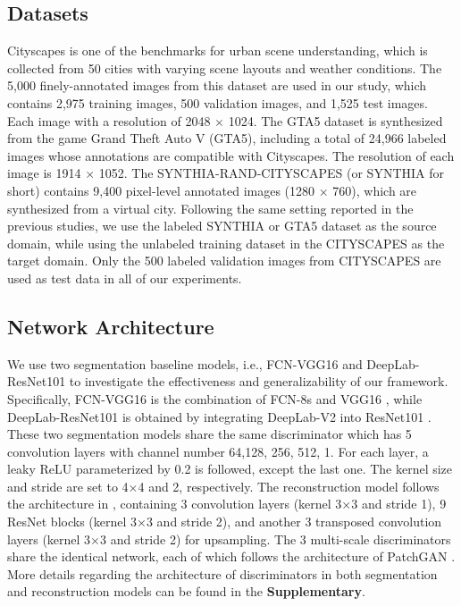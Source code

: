 \documentclass[runningheads]{llncs}
\begin{document}
	
	\subsection{Datasets}
	Cityscapes is one of the benchmarks for urban scene understanding, which is collected from 50 cities with varying scene layouts and weather conditions. The 5,000 finely-annotated images from this dataset are used in our study, which contains 2,975 training images, 500 validation images, and 1,525 test images. Each image with a resolution of 2048 $ \times $ 1024. The GTA5 dataset is synthesized from the game Grand Theft Auto V (GTA5), including a total of 24,966 labeled images whose annotations are compatible with Cityscapes. The resolution of each image is 1914 $ \times $ 1052. The SYNTHIA-RAND-CITYSCAPES (or SYNTHIA for short) contains 9,400 pixel-level annotated images (1280 $ \times $ 760), which are synthesized from a virtual city. Following the same setting reported in the previous studies, we use the labeled SYNTHIA or GTA5 dataset as the source domain, while using the unlabeled training dataset in the CITYSCAPES as the target domain. Only the 500 labeled validation images from CITYSCAPES are used as test data in all of our experiments.
	
	\subsection{Network Architecture}
	We use two segmentation baseline models, i.e., FCN-VGG16 and DeepLab-ResNet101 to investigate the effectiveness and generalizability of our framework. Specifically, FCN-VGG16 is the combination of FCN-8s \cite{long2015fully} and VGG16 \cite{simonyan2014very}, while DeepLab-ResNet101 is obtained by integrating DeepLab-V2 \cite{chen2018deeplab} into ResNet101 \cite{he2016deep}. These two segmentation models share the same discriminator which has 5 convolution layers with channel number {64,128, 256, 512, 1}. For each layer, a leaky ReLU parameterized by 0.2 is followed, except the last one. The kernel size and stride are set to 4$ \times $4 and 2, respectively. The reconstruction model follows the architecture in \cite{johnson2016perceptual}, containing 3 convolution layers (kernel 3$ \times $3 and stride 1), 9 ResNet blocks (kernel 3$ \times $3 and stride 2), and another 3 transposed convolution layers (kernel 3$ \times $3 and stride 2) for upsampling. The 3 multi-scale discriminators share the identical network, each of which follows the architecture of PatchGAN \cite{isola2017image}. More details regarding the architecture of discriminators in both segmentation and reconstruction models can be found in the \textbf{Supplementary}.
	
\end{document}
